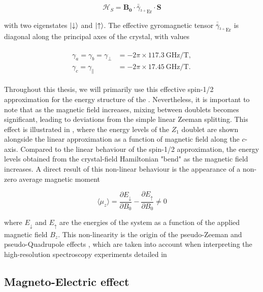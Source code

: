 \begin{equation}
    \label{eq:er_spin_hamiltonian}
    \mathcal{H}_S = \mathbf{B_0}\cdot \bar{\bar{\gamma}}_{^{3+}\text{Er}}\cdot\mathbf{S}
\end{equation}

with two eigenstates $\ket{\downarrow}$ and $\ket{\uparrow}$. The effective gyromagnetic tensor $\bar{\bar{\gamma}}_{^{3+}\text{Er}}$ is diagonal along the principal axes of the crystal, with values 

\begin{align}
\begin{split}
    \gamma_a = \gamma_b = \gamma_\perp &= -2\pi \times 117.3~\text{GHz/T}, \\
    \gamma_c = \gamma_\parallel &= -2\pi \times 17.45~\text{GHz/T}.
\end{split}
\end{align}

Throughout this thesis, we will primarily use this effective spin-1/2 approximation for the energy structure of the \Er. Nevertheless, it is important to note that as the magnetic field increases, mixing between doublets becomes significant, leading to deviations from the simple linear Zeeman splitting. This effect is illustrated in , where the energy levels of the $Z_1$ doublet are shown alongside the linear approximation as a function of magnetic field along the $c$-axis. Compared to the linear behaviour of the spin-1/2 approximation, the energy levels obtained from the crystal-field Hamiltonian "bend" as the magnetic field increases. A direct result of this non-linear behaviour is the appearance of a non-zero average magnetic moment

\begin{equation}
    \langle \mu_z \rangle = \frac{\partial E_\downarrow}{\partial B_0} - \frac{\partial E_\uparrow}{\partial B_0} \neq 0
\end{equation}

where $E_\downarrow$ and $E_\uparrow$ are the energies of the system as a function of the applied magnetic field $B_z$. This non-linearity is the origin of the pseudo-Zeeman  and pseudo-Quadrupole effects , which are taken into account when interpreting the high-resolution spectroscopy experiments detailed in 

\subsection{Magneto-Electric effect}
\label{sec:magneto-optic}

